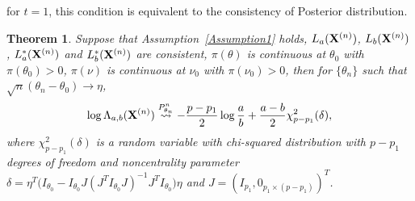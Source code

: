 \documentclass[3p]{elsarticle}
\theoremstyle{plain}
\newtheorem{theorem}{\quad\quad Theorem}
\theoremstyle{definition}
\theoremstyle{remark}
\begin{document}
    for $t=1$, this condition is equivalent to the consistency of Posterior distribution.

    \begin{theorem}\label{Thm:maintheorem}
        Suppose that Assumption~\ref{Assumption1} holds, $L_a(\mathbf{X}^{(n)})$, $L_b(\mathbf{X}^{(n)})$, $L_a^*(\mathbf{X}^{(n)})$ and $L_b^*(\mathbf{X}^{(n)})$ are consistent, $\pi(\theta)$ is continuous at $\theta_0$ with $\pi(\theta_0)>0$, $\pi(\nu)$ is continuous at $\nu_0$ with $\pi(\nu_0)>0$, then
        for $\{\theta_n\}$ such that $\sqrt{n}(\theta_n-\theta_0)\to \eta$, 
        $$
        \log \Lambda_{a,b}(\mathbf{X}^{(n)})\overset{P^n_{\theta_n}}{\rightsquigarrow}-\frac{p-p_1}{2}\log \frac{a}{b}+\frac{a-b}{2}\chi^2_{p-p_1}(\delta),
        $$
        where $\chi^2_{p-p_1}(\delta)$ is a random variable with chi-squared distribution with $p-p_1$ degrees of freedom and noncentrality parameter $\delta=\eta^T\big( I_{\theta_0}-I_{\theta_0} J(J^T I_{\theta_0} J)^{-1}J^T I_{\theta_0}\big)\eta$ and $J=(I_{p_1},0_{p_1\times(p-p_1)})^T$.


    \end{theorem}
\end{document}
